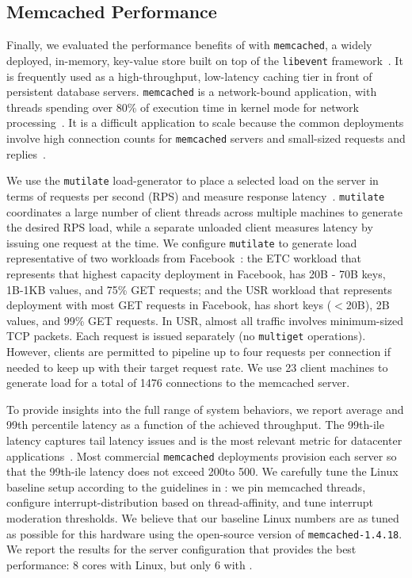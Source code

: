 

\subsection{Memcached Performance}
\label{sec:eval:memcached}




Finally, we evaluated the performance benefits of \ix with
\texttt{memcached}, a widely deployed, in-memory, key-value store built
on top of the \texttt{libevent} framework~\cite{url:memcached}. It is
frequently used as a high-throughput, low-latency caching tier in
front of persistent database servers. \texttt{memcached} is a
network-bound application, with threads spending over 80\% of
execution time in kernel mode for network
processing~\cite{DBLP:conf/eurosys/LeverichK14}. It is a difficult
application to scale because the common deployments involve high
connection counts for \texttt{memcached} servers and small-sized
requests and
replies~\cite{Atikoglu:2012:WAL,DBLP:conf/nsdi/NishtalaFGKLLMPPSSTV13}.



We use the \texttt{mutilate} load-generator to place a selected load
on the server in terms of requests per second (RPS) and measure
response latency~\cite{url:mutilate}. \texttt{mutilate} coordinates a
large number of client threads across multiple machines to generate
the desired RPS load, while a separate unloaded client measures
latency by issuing one request at the time.  We configure
\texttt{mutilate} to generate load representative of two workloads
from Facebook~\cite{Atikoglu:2012:WAL}: the ETC workload that
represents that highest capacity deployment in Facebook, has 20B - 70B
keys, 1B-1KB values, and 75\% GET requests; and the USR workload that
represents deployment with most GET requests in Facebook, has short
keys ($<$20B), 2B values, and 99\% GET requests. In USR, almost all
traffic involves minimum-sized TCP packets. Each request is issued
separately (no \texttt{multiget} operations). However, clients
are permitted to pipeline up to four requests per connection
if needed to keep up with their target request rate. We use 23
client machines to generate load for a total of
1476 connections to the memcached server.

To provide insights into the full range of system behaviors, we report
average and 99th percentile latency as a function of the achieved
throughput. The 99th-ile latency captures tail latency issues and is
the most relevant metric for datacenter
applications~\cite{DBLP:journals/cacm/DeanB13}. Most commercial
\texttt{memcached} deployments provision each server so that the
99th-ile latency does not exceed 200\microsecond to 500\microsecond.
We carefully tune the Linux baseline setup according to the guidelines
in \cite{DBLP:conf/eurosys/LeverichK14}: we pin memcached threads,
configure interrupt-distribution based on thread-affinity, and tune
interrupt moderation thresholds. We believe that our baseline Linux
numbers are as tuned as possible for this hardware using the
open-source version of \texttt{memcached-1.4.18}. We report the
results for the server configuration that provides the best
performance: 8 cores with Linux, but only 6 with \ix.

